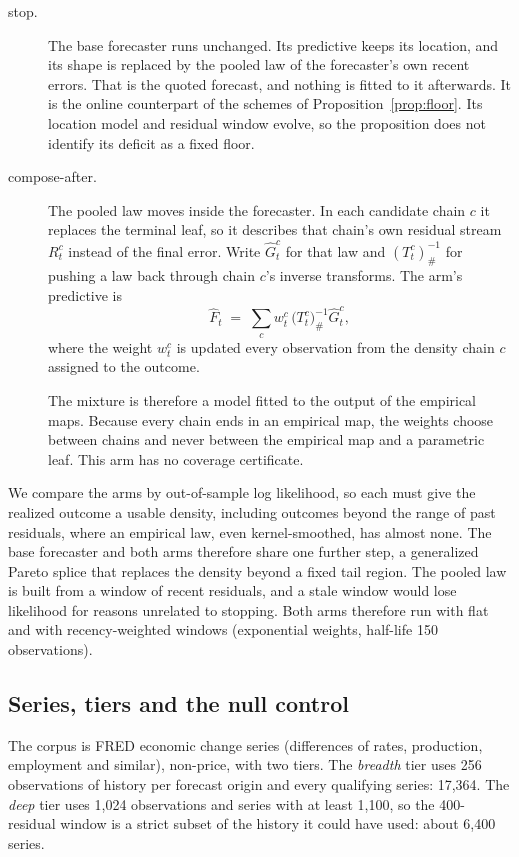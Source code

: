 \documentclass[11pt]{article}
\theoremstyle{remark}
\begin{document}
\begin{description}
\item[stop.] The base forecaster runs unchanged. Its predictive keeps its
  location, and its shape is replaced by the pooled law of the forecaster's own
  recent errors. That is the quoted forecast, and nothing is fitted to it
  afterwards. It is the online counterpart of the schemes of
  Proposition~\ref{prop:floor}. Its location model and residual window evolve, so the proposition does not identify its deficit as a fixed floor.

\item[compose-after.] The pooled law moves inside the forecaster. In each
  candidate chain $c$ it replaces the terminal leaf, so it describes that
  chain's own residual stream $R^c_t$ instead of the final error. Write
  $\widehat G^c_t$ for that law and $(T^c_t)^{-1}_{\#}$ for pushing a law back
  through chain $c$'s inverse transforms. The arm's predictive is
  \[
  \widehat F_t \;=\; \sum_c w^c_t \,\big(T^c_t\big)^{-1}_{\#}\widehat G^c_t ,
  \]
  where the weight $w^c_t$ is updated every observation from the density chain
  $c$ assigned to the outcome.

  The mixture is therefore a model fitted to the output of the empirical maps. Because every chain ends in an empirical map,
  the weights choose between chains and never between the empirical map and a
  parametric leaf. This arm has no coverage certificate.
\end{description}

We compare the arms by out-of-sample log likelihood, so each must give the
realized outcome a usable density, including outcomes beyond the range of past
residuals, where an empirical law, even kernel-smoothed, has almost none. The base
forecaster and both arms therefore share one further step, a generalized Pareto
splice that replaces the density beyond a fixed tail region. The pooled law
is built from a window of recent residuals, and a stale window would lose likelihood
for reasons unrelated to stopping. Both arms therefore run with flat and with
recency-weighted windows (exponential weights, half-life 150 observations).

\subsection{Series, tiers and the null control}\label{sec:design}

The corpus is FRED economic change series (differences of rates, production,
employment and similar), non-price, with two tiers. The \emph{breadth} tier
uses 256 observations of history per forecast origin and every qualifying
series: 17{,}364. The \emph{deep} tier uses 1{,}024 observations and series with at
least 1{,}100, so the 400-residual window is a strict subset of the history it
could have used: about 6{,}400 series.
\end{document}
